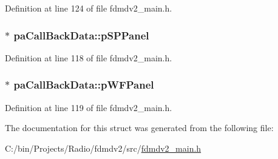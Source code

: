 Definition at line 124 of file fdmdv2\-\_\-main.\-h.

\hypertarget{structpa_call_back_data_a6741cb7e3a02a9a7edde123b8d810014}{
\subsubsection[{p\-S\-P\-Panel}]{$\ast$ pa\-Call\-Back\-Data\-::p\-S\-P\-Panel}}\label{structpa_call_back_data_a6741cb7e3a02a9a7edde123b8d810014}


Definition at line 118 of file fdmdv2\-\_\-main.\-h.

\hypertarget{structpa_call_back_data_a794284622a48e32d327f4787d9acb9fa}{
\subsubsection[{p\-W\-F\-Panel}]{$\ast$ pa\-Call\-Back\-Data\-::p\-W\-F\-Panel}}\label{structpa_call_back_data_a794284622a48e32d327f4787d9acb9fa}


Definition at line 119 of file fdmdv2\-\_\-main.\-h.



The documentation for this struct was generated from the following file\-:\begin{DoxyCompactItemize}
\item 
C\-:/bin/\-Projects/\-Radio/fdmdv2/src/\hyperlink{fdmdv2__main_8h}{fdmdv2\-\_\-main.\-h}\end{DoxyCompactItemize}
